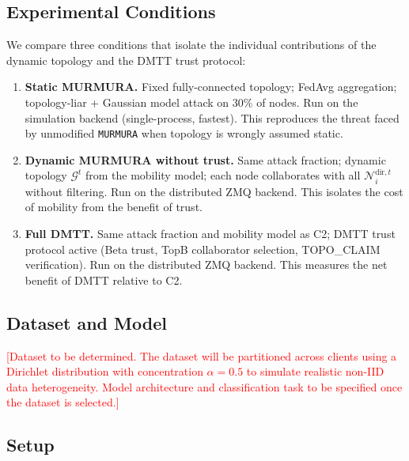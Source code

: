 \documentclass[journal]{IEEEtran}
\newenvironment{added}{\begingroup\color{addedcolor}}{\endgroup}
\theoremstyle{definition}
\theoremstyle{remark}
\begin{document}
\begin{added}
\subsection{Experimental Conditions}

We compare three conditions that isolate the individual contributions of the dynamic topology and the DMTT trust protocol:

\begin{enumerate}[leftmargin=2em, label=\textbf{C\arabic*.}]
  \item \textbf{Static MURMURA.} Fixed fully-connected topology; FedAvg aggregation; topology-liar + Gaussian model attack on 30\% of nodes. Run on the simulation backend (single-process, fastest). This reproduces the threat faced by unmodified \texttt{MURMURA} when topology is wrongly assumed static.
  \item \textbf{Dynamic MURMURA without trust.} Same attack fraction; dynamic topology $\mathcal{G}^t$ from the mobility model; each node collaborates with all $\mathcal{N}_i^{\mathrm{dir},t}$ without filtering. Run on the distributed ZMQ backend. This isolates the cost of mobility from the benefit of trust.
  \item \textbf{Full DMTT.} Same attack fraction and mobility model as C2; DMTT trust protocol active (Beta trust, TopB collaborator selection, TOPO\_CLAIM verification). Run on the distributed ZMQ backend. This measures the net benefit of DMTT relative to C2.
\end{enumerate}

\subsection{Dataset and Model}

\textcolor{red}{[Dataset to be determined. The dataset will be partitioned across clients using a Dirichlet distribution with concentration $\alpha = 0.5$ to simulate realistic non-IID data heterogeneity. Model architecture and classification task to be specified once the dataset is selected.]}

\subsection{Setup}


\end{added}
\end{document}
